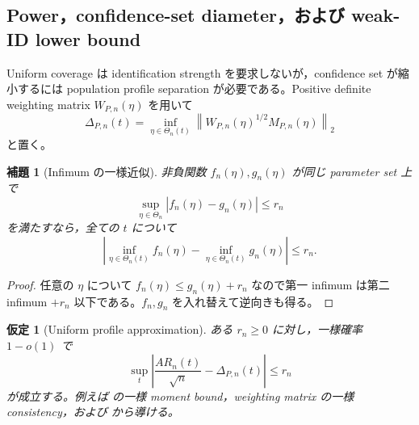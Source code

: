 \documentclass[11pt,a4paper]{ltjsarticle}
\newtheorem{assumption}{仮定}[section]
\newtheorem{lemma}{補題}[section]
\theoremstyle{remark}
\newcommand{\norm}[1]{\left\lVert#1\right\rVert}
\begin{document}
\subsection{Power，confidence-set diameter，および weak-ID lower bound}
Uniform coverage は identification strength を要求しないが，confidence set が縮小するには population profile separation が必要である。Positive definite weighting matrix $W_{P,n}(\eta)$ を用いて
\begin{equation}
\Delta_{P,n}(t)
=\inf_{\eta\in\Theta_n(t)}
\norm{W_{P,n}(\eta)^{1/2}M_{P,n}(\eta)}_2
\label{eq:profilesep}
\end{equation}
と置く。

\begin{lemma}[Infimum の一様近似]\label{lem:profileinfapprox}
非負関数 $f_n(\eta),g_n(\eta)$ が同じ parameter set 上で
\[
\sup_{\eta\in\Theta_n}|f_n(\eta)-g_n(\eta)|\le r_n
\]
を満たすなら，全ての $t$ について
\[
\left|
\inf_{\eta\in\Theta_n(t)}f_n(\eta)
-
\inf_{\eta\in\Theta_n(t)}g_n(\eta)
\right|\le r_n.
\]
\end{lemma}

\begin{proof}
任意の $\eta$ について $f_n(\eta)\le g_n(\eta)+r_n$ なので第一 infimum は第二 infimum $+r_n$ 以下である。$f_n,g_n$ を入れ替えて逆向きも得る。
\end{proof}

\begin{assumption}[Uniform profile approximation]\label{as:profileapprox}
ある $r_n\ge0$ に対し，一様確率 $1-o(1)$ で
\begin{equation}
\sup_t
\left|
\frac{AR_n(t)}{\sqrt n}-\Delta_{P,n}(t)
\right|\le r_n
\label{eq:profileapprox}
\end{equation}
が成立する。例えば の一様 moment bound，weighting matrix の一様 consistency，および から導ける。
\end{assumption}
\end{document}
